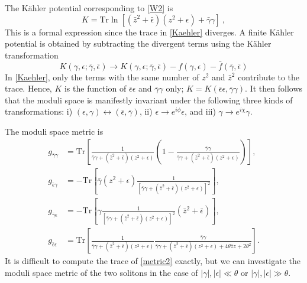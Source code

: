 \documentclass[a4paper,12pt]{article}
\begin{document}
The K\"ahler potential corresponding to \eqref{W2} is
\begin{equation}
K=\mbox{Tr}\ln\left[(\bar{z}^2+\bar{\epsilon})
(z^2+\epsilon)+\bar{\gamma}\gamma\right]\ ,\label{Kaehler}
\end{equation}
This is a formal expression since the trace in 
\eqref{Kaehler} diverges.
A finite K\"ahler potential is obtained by subtracting the divergent terms 
using the K\"ahler transformation
\begin{equation}
K(\gamma,\epsilon;\bar{\gamma},\bar{\epsilon}) \rightarrow K(\gamma,\epsilon;\bar{\gamma},\bar{\epsilon})
-f(\gamma,\epsilon)-\bar{f}(\bar{\gamma},\bar{\epsilon})
\end{equation}
In \eqref{Kaehler}, only the terms with the same number of $z^2$ 
and $\bar{z}^2$ contribute to the trace. 
Hence, $K$ is the function of $\bar{\epsilon}\epsilon$ 
and $\bar{\gamma}\gamma$ only; $K=K(\bar{\epsilon}\epsilon, \bar{\gamma}
\gamma)$. It then follows that the moduli 
space is manifestly invariant under the following
three kinds of transformations: 
i) $(\epsilon, \gamma)\leftrightarrow (\bar{\epsilon}, \bar{\gamma})$, 
ii) $\epsilon \rightarrow e^{i\phi}\epsilon$, 
and iii) $\gamma \rightarrow e^{i\chi}\gamma$.

The moduli space metric is
\begin{subequations}\label{metric2}
\begin{align}
g_{\bar{\gamma}\gamma}&=\mbox{Tr}\left[\frac{1}{\bar{\gamma}\gamma+(\bar{z}^2+\bar{\epsilon})(z^2+\epsilon)}
\left(1-\frac{\bar{\gamma}\gamma}{\bar{\gamma}\gamma+(\bar{z}^2+\bar{\epsilon})(z^2+\epsilon)}\right)\right],\label{gg}\\
g_{\bar{\epsilon}\gamma}&=-\mbox{Tr}\left[\bar{\gamma}(z^2+\epsilon)
\frac{1}{[\bar{\gamma}\gamma+(\bar{z}^2+\bar{\epsilon})(z^2+\epsilon)]^2}\right],\label{ge}\\
g_{\bar{\gamma}\epsilon}&=-\mbox{Tr}\left[\gamma\frac{1}{[\bar{\gamma}\gamma+
(\bar{z}^2+\bar{\epsilon})(z^2+\epsilon)]^2}(\bar{z}^2+\bar{\epsilon})\right],\label{eg}\\
g_{\bar{\epsilon}\epsilon}&=\mbox{Tr}\left[\frac{1}{\bar{\gamma}\gamma+(\bar{z}^2+\bar{\epsilon})(z^2+\epsilon)}
\frac{\bar{\gamma}\gamma}{\bar{\gamma}\gamma+(\bar{z}^2+\bar{\epsilon})(z^2+\epsilon)+4\theta\bar{z}z+2\theta^2}\right].
\label{ee}
\end{align}
\end{subequations}
It is difficult to compute the trace of \eqref{metric2} exactly, but we can investigate the moduli space metric 
of the two solitons in the case of $|\gamma|,|\epsilon| \ll \theta$ or $|\gamma|,|\epsilon| \gg \theta$.
\end{document}
